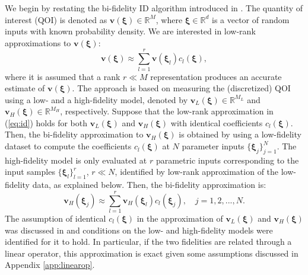 \documentclass[preprint,10pt]{elsarticle}
\begin{document}
We begin by restating the bi-fidelity ID algorithm introduced in \cite{doostan2016bi}. The quantity of interest (QOI) is denoted as $\boldsymbol v(\boldsymbol\xi) \in \mathbb{R}^{M}$, where $\boldsymbol \xi \in \mathbb{R}^d$ is a vector of random inputs with known probability density. We are interested in low-rank approximations to $\boldsymbol v(\boldsymbol\xi)$:
\begin{equation}
\label{eq:id}
    \boldsymbol v(\boldsymbol\xi) \approx \sum_{l=1}^r \boldsymbol v(\boldsymbol\xi_l) c_l(\boldsymbol\xi),
\end{equation}
%
where it is assumed that a rank $r\ll M$ representation produces an accurate estimate of $\bm{v}(\bm\xi)$. The approach is based on measuring the (discretized) QOI using a low- and a high-fidelity model, denoted by $\boldsymbol v_L(\boldsymbol\xi) \in \mathbb{R}^{M_L}$ and $\boldsymbol v_H(\boldsymbol\xi) \in \mathbb{R}^{M_H}$, respectively. Suppose that the low-rank approximation in (\ref{eq:id}) holds for both $\boldsymbol v_L(\boldsymbol\xi)$ and $\boldsymbol v_H(\boldsymbol\xi)$ with identical coefficients $c_l(\boldsymbol\xi)$. Then, the bi-fidelity approximation to $\boldsymbol v_H(\boldsymbol\xi)$ is obtained by using a low-fidelity dataset to compute the coefficients $c_l(\boldsymbol\xi)$ at $N$ parameter inputs $\{ \boldsymbol \xi_j \}_{j=1}^N$. The high-fidelity model is only evaluated at $r$ parametric inputs corresponding to the input samples $\{ \boldsymbol \xi_l \}_{l=1}^r$, $r \ll N$, identified by low-rank approximation of the low-fidelity data, as explained below. Then, the bi-fidelity approximation is:
%
\begin{equation}
\label{eq:id2}
    \boldsymbol v_H(\boldsymbol\xi_j) \approx \sum_{l=1}^r \boldsymbol v_H(\boldsymbol\xi_l) c_l(\boldsymbol\xi_j), \quad j=1, 2, ..., N.
\end{equation}
%
The assumption of identical $c_l(\boldsymbol\xi)$ in the approximation of $\boldsymbol v_L(\boldsymbol\xi)$ and $\boldsymbol v_H(\boldsymbol\xi)$ was discussed in \cite{hampton2018} and conditions on the low- and high-fidelity models were identified for it to hold. In particular, if the two fidelities are related through a linear operator, this approximation is exact given some assumptions discussed in Appendix \ref{app:linearop}.
\end{document}
